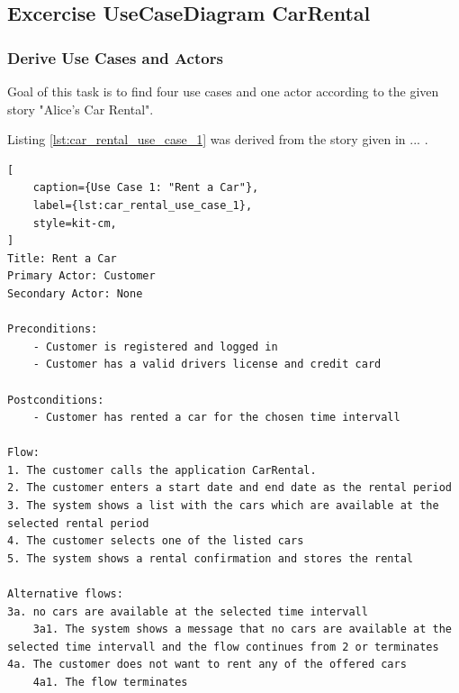 \subsection{Excercise UseCaseDiagram CarRental}
\label{sec:exercise_use_case_diagram_car_rental}
\subsubsection*{Derive Use Cases and Actors}
Goal of this task is to find four use cases and one actor according to the given story "Alice's Car Rental".

Listing \autoref{lst:car_rental_use_case_1} was derived from the story given in ... .

\begin{lstlisting}[
    caption={Use Case 1: "Rent a Car"},
    label={lst:car_rental_use_case_1},
    style=kit-cm,
]
Title: Rent a Car
Primary Actor: Customer
Secondary Actor: None

Preconditions:
    - Customer is registered and logged in
    - Customer has a valid drivers license and credit card

Postconditions:
    - Customer has rented a car for the chosen time intervall

Flow:
1. The customer calls the application CarRental.
2. The customer enters a start date and end date as the rental period
3. The system shows a list with the cars which are available at the selected rental period
4. The customer selects one of the listed cars
5. The system shows a rental confirmation and stores the rental

Alternative flows:
3a. no cars are available at the selected time intervall
    3a1. The system shows a message that no cars are available at the selected time intervall and the flow continues from 2 or terminates
4a. The customer does not want to rent any of the offered cars
    4a1. The flow terminates    
\end{lstlisting}



